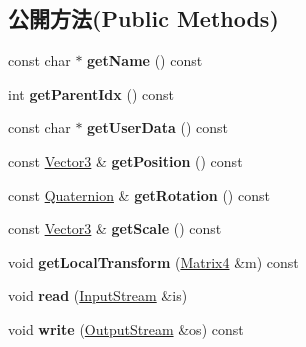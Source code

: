 \subsection*{公開方法(Public Methods)}
\begin{DoxyCompactItemize}
\item 
const char $\ast$ {\bfseries get\+Name} () const \hypertarget{class_magnum_1_1endif_1_1_node_a58bcf584868b05b031287cd86328240c}{}\label{class_magnum_1_1endif_1_1_node_a58bcf584868b05b031287cd86328240c}

\item 
int {\bfseries get\+Parent\+Idx} () const \hypertarget{class_magnum_1_1endif_1_1_node_aa011299b9a49d98646683961da17b08d}{}\label{class_magnum_1_1endif_1_1_node_aa011299b9a49d98646683961da17b08d}

\item 
const char $\ast$ {\bfseries get\+User\+Data} () const \hypertarget{class_magnum_1_1endif_1_1_node_afba2ac1c83a80a406d5c8a8f2d9c37a6}{}\label{class_magnum_1_1endif_1_1_node_afba2ac1c83a80a406d5c8a8f2d9c37a6}

\item 
const \hyperlink{class_magnum_1_1_vector3}{Vector3} \& {\bfseries get\+Position} () const \hypertarget{class_magnum_1_1endif_1_1_node_a6440fb26decebae92d4a156d65041629}{}\label{class_magnum_1_1endif_1_1_node_a6440fb26decebae92d4a156d65041629}

\item 
const \hyperlink{class_magnum_1_1_quaternion}{Quaternion} \& {\bfseries get\+Rotation} () const \hypertarget{class_magnum_1_1endif_1_1_node_a6fc778a1387a59585783e1d3456bf97a}{}\label{class_magnum_1_1endif_1_1_node_a6fc778a1387a59585783e1d3456bf97a}

\item 
const \hyperlink{class_magnum_1_1_vector3}{Vector3} \& {\bfseries get\+Scale} () const \hypertarget{class_magnum_1_1endif_1_1_node_a9ad9c4184b5613c034e4620b65601ec0}{}\label{class_magnum_1_1endif_1_1_node_a9ad9c4184b5613c034e4620b65601ec0}

\item 
void {\bfseries get\+Local\+Transform} (\hyperlink{class_magnum_1_1_matrix4}{Matrix4} \&m) const \hypertarget{class_magnum_1_1endif_1_1_node_a2e30d6ae1574190fa959d4f99ee68580}{}\label{class_magnum_1_1endif_1_1_node_a2e30d6ae1574190fa959d4f99ee68580}

\item 
void {\bfseries read} (\hyperlink{class_magnum_1_1_input_stream}{Input\+Stream} \&is)\hypertarget{class_magnum_1_1endif_1_1_node_a43a5727606ff18401be69552d3d22597}{}\label{class_magnum_1_1endif_1_1_node_a43a5727606ff18401be69552d3d22597}

\item 
void {\bfseries write} (\hyperlink{class_magnum_1_1_output_stream}{Output\+Stream} \&os) const \hypertarget{class_magnum_1_1endif_1_1_node_a59dac4b0aa6696715723c6daffa58b23}{}\label{class_magnum_1_1endif_1_1_node_a59dac4b0aa6696715723c6daffa58b23}

\end{DoxyCompactItemize}
